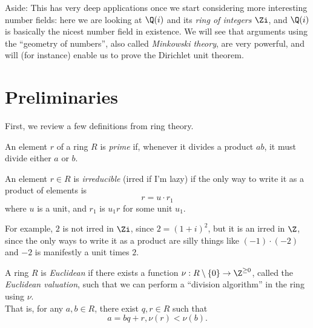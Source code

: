 \documentclass{scrbook}
\begin{document}

Aside: This has very deep applications once we start considering more interesting number fields:
here we are looking at $\Q(i)$ and its \textit{ring of integers} $\Zi$, and
$\Q(i)$ is basically the nicest number field in existence. We will see that
arguments using the ``geometry of numbers'', also called \textit{Minkowski
  theory}, are very powerful, and will (for instance) enable us to prove the
Dirichlet unit theorem.

\section{Preliminaries}

First, we review a few definitions from ring theory.

\begin{defn}
  An element $r$ of a ring $R$ is \textit{prime} if, whenever it divides a
  product $ab$, it must divide either $a$ or $b$.
\end{defn}

\begin{defn}
  An element $r\in R$ is \textit{irreducible} (irred if I'm lazy) if the only
  way to write it as a product of elements is
  $$r=u\cdot r_1$$
  where $u$ is a unit, and $r_1$ is $u_1r$ for some unit $u_1$.
\end{defn}
For example, $2$ is not irred in $\Zi$, since $2={(1+i)}^2$, but it is an irred
in $\Z$, since the only ways to write it as a product are silly things like
$(-1)\cdot (-2)$ and $-2$ is manifestly a unit times $2$. 

\begin{defn}
 A ring $R$ is \textit{Euclidean} if there exists a function $\nu :
 R\setminus\{0\}\to\Z^{\geq 0}$, called the
 \textit{Euclidean valuation}, such that we can perform a ``division algorithm'' in
 the ring using $\nu$.\\That is, for any $a, b\in R$, there exist $q, r\in R$ such that
 $$a=bq+r, \nu(r) < \nu(b).$$
\end{defn}
\end{document}
